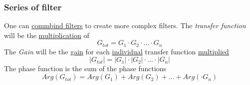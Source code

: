 \subsubsection{Series of filter}
One can \underline{commbind filters} to create more complex filters.
The \textit{transfer function} will be the \underline{multiplication} of 
\begin{equation}
    G_{tot} = G_{1}\cdot{G_2}\cdot \ldots \cdot{G_n}
\end{equation}
The \textit{Gain} will be the \underline{gain} for each \underline{individual} transfer function \underline{multiplied}
\begin{equation}
    |G_{tot}| = |G_{1}|\cdot|{G_2}|\cdot \ldots \cdot|{G_n}|
\end{equation}
The phase function is the sum of the phase functions
\begin{equation}
    Arg(G_{tot}) = Arg(G_{1})+Arg({G_2})+\ldots+Arg(\cdot{G_n})
\end{equation}




